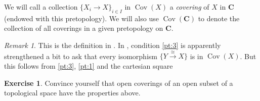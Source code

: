 \documentclass[12pt,reqno,a4paper]{amsart}
\theoremstyle{plain}
\theoremstyle{definition}
\newtheorem{xca}[thm]{Exercise}
\theoremstyle{remark}
\newtheorem{rem}[thm]{Remark}
\begin{document}
We will call a collection $\{ X_{i} \to X \}_{i \in I}$ in $\operatorname{Cov}(X)$ a \textit{covering} of $X$ in $\mathbf{C}$ (endowed with this pretopology).
We will also use $\operatorname{Cov}(\mathbf{C})$ to denote the collection of all coverings in a given pretopology on $\mathbf{C}$.

\begin{rem}
  This is the definition in \cite{sga4}.
  In \cite{stacks-project}, condition \ref{pt:3} is apparently strengthened a bit to ask that every isomorphism $\{ Y \xrightarrow{\cong} X \}$ is in $\operatorname{Cov}(X)$.
  But this follows from \ref{pt:3}, \ref{pt:1} and the cartesian square
  \begin{center}
  \end{center}
\end{rem}

\begin{xca}
  Convince yourself that open coverings of an open subset of a topological space have the properties above.
\end{xca}
\end{document}
